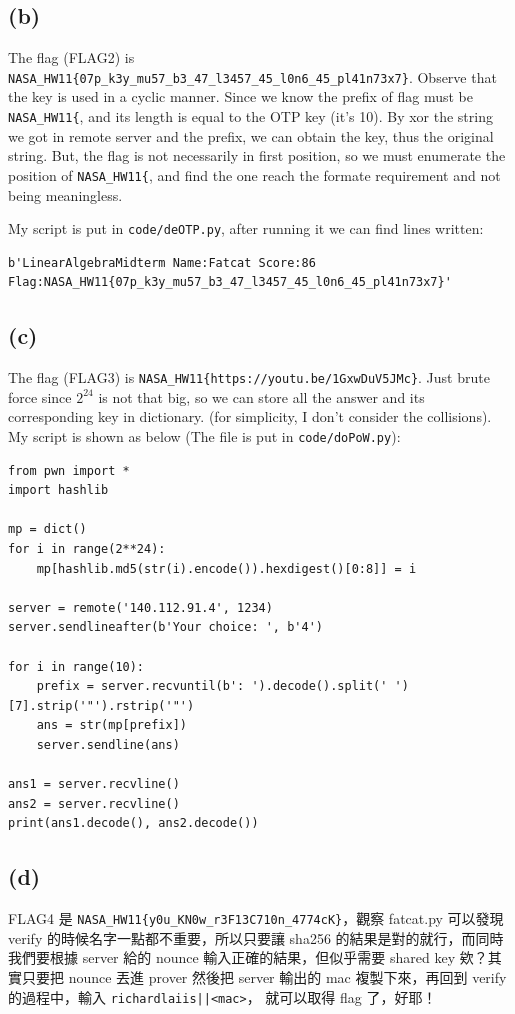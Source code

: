 \documentclass[12pt]{article}
\begin{document}
\subsection*{(b)}
The flag (FLAG2) is \verb|NASA_HW11{07p_k3y_mu57_b3_47_l3457_45_l0n6_45_pl41n73x7}|. Observe that the key is used in a cyclic manner. Since we know the prefix of flag must be \verb|NASA_HW11{|, and its length is equal to the OTP key (it's 10). By xor the string we got in remote server and the prefix, we can obtain the key, thus the original string. But, the flag is not necessarily in first position, so we must enumerate the position of \verb|NASA_HW11{|, and find the one reach the formate requirement and not being meaningless.

My script is put in \verb|code/deOTP.py|, after running it we can find lines written:
\begin{Verbatim}[linenos, breaklines]
b'LinearAlgebraMidterm Name:Fatcat Score:86 Flag:NASA_HW11{07p_k3y_mu57_b3_47_l3457_45_l0n6_45_pl41n73x7}'
\end{Verbatim}
\subsection*{(c)}
The flag (FLAG3) is \verb|NASA_HW11{https://youtu.be/1GxwDuV5JMc}|. Just brute force since $2^{24}$ is not that big, so we can store all the answer and its corresponding key in dictionary. (for simplicity, I don't consider the collisions). My script is shown as below (The file is put in \verb|code/doPoW.py|):
\begin{verbatim}
from pwn import *
import hashlib

mp = dict()
for i in range(2**24):
    mp[hashlib.md5(str(i).encode()).hexdigest()[0:8]] = i

server = remote('140.112.91.4', 1234)
server.sendlineafter(b'Your choice: ', b'4')

for i in range(10):
    prefix = server.recvuntil(b': ').decode().split(' ')[7].strip('"').rstrip('"')
    ans = str(mp[prefix])
    server.sendline(ans)

ans1 = server.recvline()
ans2 = server.recvline()
print(ans1.decode(), ans2.decode())
\end{verbatim}
\subsection*{(d)}
FLAG4 是 \verb|NASA_HW11{y0u_KN0w_r3F13C710n_4774cK}|，觀察 fatcat.py 可以發現 verify 的時候名字一點都不重要，所以只要讓 sha256 的結果是對的就行，而同時我們要根據 server 給的 nounce 輸入正確的結果，但似乎需要 shared key 欸？其實只要把 nounce 丟進 prover 然後把 server 輸出的 mac 複製下來，再回到 verify 的過程中，輸入 \texttt{richardlaiis||<mac>}， 就可以取得 flag 了，好耶！
\end{document}
